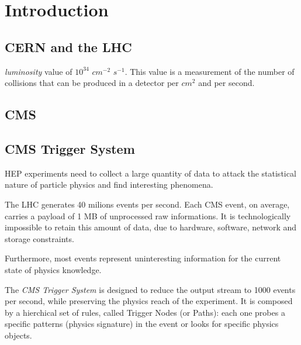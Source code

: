 \chapter{Introduction}








\section{CERN and the LHC}

\textit{luminosity} value of $10^{34}$ $cm^{-2}$ $s^{-1}$. This value is a measurement of the number of collisions that can be produced in a detector per $cm^2$ and per second.

\section{CMS}


\section{CMS Trigger System}

HEP experiments need to collect a large quantity of data to attack the statistical nature of particle physics and find interesting phenomena.

The LHC generates 40 milions events per second. Each CMS event, on average, carries a payload of 1 MB of unprocessed raw informations. It is technologically impossible to retain this amount of data, due to hardware, software, network and storage constraints.

Furthermore, most events represent uninteresting information for the current state of physics knowledge.

The \textit{CMS Trigger System} is designed to reduce the output stream to 1000 events per second, while preserving the physics reach of the experiment.
It is composed by a hierchical set of rules, called Trigger Nodes (or Paths): each one probes a specific patterns (physics signature) in the event or looks for specific physics objects.

